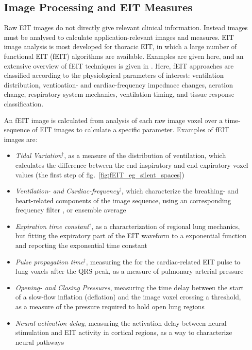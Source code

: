 \documentclass[12pt]{article} \usepackage[margin=3cm]{geometry} \usepackage[margin=20pt,font=small,labelfont=bf]{caption}\def\TBLWIDA{35mm}\def\TBLWIDB{95mm}
\newcommand\fref[1]{fig.\ \ref{#1}}
\begin{document}
\subsection{Image Processing and EIT Measures}

Raw EIT images do not directly give relevant clinical information.
Instead images must be analysed to calculate application-relevant images
and measures. 
EIT image analysis is most developed for thoracic EIT, in which a
large number of functional EIT (fEIT) algorithms are available.
Examples are given here, and an extensive overview of fEIT techniques
is given in  \cite{Frerichs2017Chest}.
Here, fEIT approaches are classified according to the 
physiological parameters of interest: ventilation distribution,
ventioation- and cardiac-frequency impednace changes, 
aeration change, respiratory system mechanics, ventilation
timing, and tissue response classification.

An fEIT image is calculated from  analysis of each raw image voxel
over a time-sequence
of EIT images to calculate a specific parameter.
 Examples of fEIT images are:
\begin{itemize}
\item
{\em Tidal Variation}$^\dagger$, as a measure of the
distribution of ventilation, which calculates
the difference between the end-inspiratory and
end-expiratory voxel values \cite{Hahn1995Distribution}
(the first step of \fref{fig:fEIT_eg_silent_spaces})
\item
{\em Ventilation- and Cardiac-frequency}$^\dagger$, which
 characterize the breathing- and heart-related components
of the image sequence, using an corresponding frequency
filter \cite{Ferrario2012morphological}, or ensemble average 
\item
{\em Expiration time constant}$^\dagger$, as a characterization
of regional lung mechanics, but fitting the expiratory part of
the EIT waveform to a exponential function and reporting the
exponential time constant \cite{Pulletz2012Dynamics}
\item
{\em Pulse propagation time}$^\dagger$, measuring the for the cardiac-related
EIT pulse to lung voxels after the QRS peak, as a measure of pulmonary
arterial pressure \cite{Proenca2016Noninvasive} 
\item
{\em Opening- and Closing Pressures}, measuring the time delay
between the start of a slow-flow inflation (deflation) and the image voxel
crossing a threshold, as a measure of the pressure required to hold
open lung regions \cite{Pulletz2012Opening}  
\item
{\em Neural activation delay}, measuring the activation delay between
neural stimulation and EIT activity in cortical regions, as
a way to characterize neural pathways \cite{Aristovich2014Neural}
\end{itemize}
\end{document}
